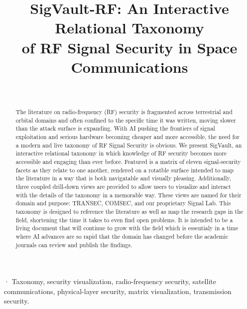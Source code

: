\documentclass[journal]{IEEEtran}
\begin{document}
\title{SigVault-RF: An Interactive Relational Taxonomy \\ of RF Signal Security in Space Communications}

\author{%
\\
}

\maketitle

\begin{abstract}
The literature on radio-frequency (RF) security is fragmented across terrestrial and orbital domains and often confined to the specific time it was written, moving slower than the attack surface is expanding. With AI pushing the frontiers of signal exploitation and serious hardware becoming cheaper and more accessible, the need for a modern and live taxonomy of RF Signal Security is obvious. We present SigVault, an interactive relational taxonomy in which knowledge of RF security becomes more accessible and engaging than ever before. Featured is a matrix of eleven signal-security facets as they relate to one another, rendered on a rotatble surface intended to map the literature in a way that is both navigatable and visually pleasing. Additionally, three coupled drill-down views are provided to allow users to visualize and interact with the details of the taxonomy in a memorable way. These views are named for their domain and purpose: TRANSEC, COMSEC, and our proprietary Signal Lab. This taxonomy is designed to reference the literature as well as map the research gaps in the field, shortening the time it takes to even find open problems. It is intended to be a living document that will continue to grow with the field which is essentialy in a time where AI advances are so rapid that the domain has changed before the academic journals can review and publish the findings.   
\end{abstract}

\begin{IEEEkeywords}·
Taxonomy, security visualization, radio-frequency security, satellite
communications, physical-layer security, matrix visualization, transmission
security.
\end{IEEEkeywords}
\end{document}
